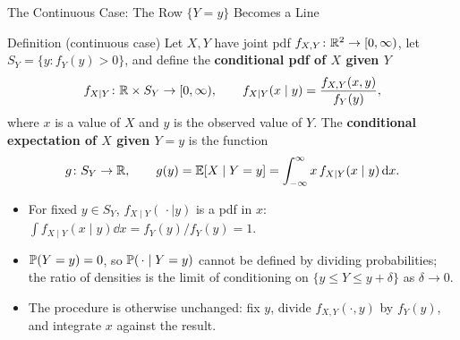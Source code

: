 \begin{frame}{The Continuous Case: The Row $\{Y=y\}$ Becomes a Line}
  \small
  \begin{block}{Definition (continuous case)}
    Let $X,Y$ have joint pdf $f_{X,Y}\colon\mathbb{R}^2\to[0,\infty)$, let $S_Y=\{y : f_Y(y)>0\}$, and define the \textbf{conditional pdf of $X$ given $Y$}
    \[
      f_{X\mid Y}\colon\mathbb{R}\times S_Y\to[0,\infty),\qquad f_{X\mid Y}(x\mid y)=\frac{f_{X,Y}(x,y)}{f_Y(y)},
    \]
    where $x$ is a value of $X$ and $y$ is the observed value of $Y$. The \textbf{conditional expectation of $X$ given $Y=y$} is the function
    \[
      g\colon S_Y\to\mathbb{R},\qquad g(y)=\mathbb{E}[X\mid Y=y]=\int_{-\infty}^{\infty}x\,f_{X\mid Y}(x\mid y)\,\mathrm{d} x .
    \]
  \end{block}
  \begin{itemize}
    \item For fixed $y\in S_Y$, $f_{X\mid Y}(\,\cdot\mid y)$ is a pdf in $x$: $\int f_{X\mid Y}(x\mid y)\dd x=f_Y(y)/f_Y(y)=1$.
    \item $\mathbb{P}(Y=y)=0$, so $\mathbb{P}(\,\cdot\mid Y=y)$ cannot be defined by dividing probabilities; the ratio of densities is the limit of conditioning on $\{y\le Y\le y+\delta\}$ as $\delta\to0$.
    \item The procedure is otherwise unchanged: fix $y$, divide $f_{X,Y}(\cdot,y)$ by $f_Y(y)$, and integrate $x$ against the result.
  \end{itemize}
\end{frame}

